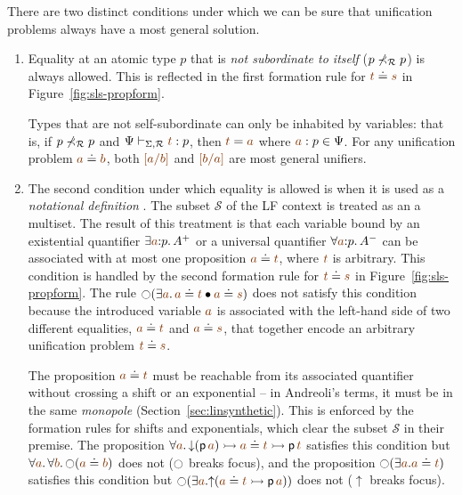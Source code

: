 There are two distinct conditions under which we can be sure that
unification problems always have a most general solution.  \smallskip
\begin{enumerate}
\item Equality at an atomic type $p$ that is {\it not subordinate
    to itself} ($p \not\prec_\mathcal R p$) is always allowed.  This is
  reflected in the first formation rule for $\lf{t} \doteq
  \lf{s}$ in Figure~\ref{fig:sls-propform}. 

  Types that are not self-subordinate can only be inhabited by
  variables: that is, if $p \not\prec_\mathcal R p$ and $\Psi
  \vdash_{\Sigma,\subord} \lf{t} : p$, then $\lf{t} = \lf{{a}}$ where
  $\lf{a}:p \in \Psi$. For any unification problem $\lf{{a}}
  \doteq \lf{{b}}$, both $\lf{[{a}/b]}$ and $\lf{[{b}/a]}$ are most
  general unifiers.

\item The second condition under which equality is allowed is when it
  is used as a {\it notational definition}
  \cite{pfenning99algorithms}. The subset $\mathcal S$ of the LF
  context is treated as an a multiset. The result of this treatment is
  that each variable bound by an existential quantifier $\exists
  \lf{a}{:}p.\,A^+$ or a universal quantifier $\forall
  \lf{a}{:}p.\,A^-$ can be associated with at most one proposition
  $\lf{a} \doteq \lf{t}$, where $\lf{t}$ is arbitrary. This condition
  is handled by the second formation rule for $\lf{t} \doteq \lf{s}$
  in Figure~\ref{fig:sls-propform}. The
  rule ${\ocircle}(\exists \lf{a}.\, \lf{a} \doteq \lf{t} \fuse
  \lf{a} \doteq \lf{s})$ does not satisfy this condition because the
  introduced variable $\lf{a}$ is associated with the left-hand side
  of two different equalities, $\lf{a} \doteq \lf{t}$ and $\lf{a}
  \doteq \lf{s}$, that together encode an arbitrary unification
  problem $\lf{t} \doteq \lf{s}$.


  The proposition $\lf{a} \doteq \lf{t}$ must be reachable from its
  associated quantifier without crossing a shift or an exponential --
  in Andreoli's terms, it must be in the same {\it monopole}
  (Section~\ref{sec:linsynthetic}).
  This is enforced by the formation rules for shifts and exponentials,
  which clear the subset $\mathcal S$ in their premise.  The
  proposition $\forall \lf{a}.\, {\downarrow}({\sf
    p}\,\lf{a}) \lefti \lf{a} \doteq \lf{t} \lefti {\sf p}\,\lf{t}$
  satisfies this condition but $\forall \lf{a}.\,\forall
  \lf{b}.\,{\ocircle}(\lf{a} \doteq \lf{b})$ does not ($\ocircle$
  breaks focus), and the proposition ${\ocircle}(\exists
  \lf{a}. \lf{a} \doteq \lf{t})$ satisfies this condition but
  ${\ocircle}(\exists \lf{a}.  {\uparrow}(\lf{a} \doteq \lf{t} \lefti
  {\sf p}\,\lf{a}))$ does not (${\uparrow}$ breaks focus).  

\end{enumerate}
\smallskip


